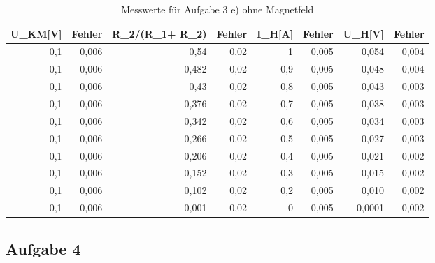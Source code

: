 \documentclass[12pt]{scrartcl}
\begin{document}
\begin{table}[htbp]
\caption{Messwerte für Aufgabe 3 e) ohne Magnetfeld}
\begin{center}
\begin{tabular}{|r|r|r|r|r|r|r|r|}
\hline
\multicolumn{1}{|l|}{U\_KM[V]} & \multicolumn{1}{l|}{Fehler} & \multicolumn{1}{l|}{R\_2/(R\_1+ R\_2)} & \multicolumn{1}{l|}{Fehler} & \multicolumn{1}{l|}{I\_H[A]} & \multicolumn{1}{l|}{Fehler} & \multicolumn{1}{l|}{U\_H[V]} & \multicolumn{1}{l|}{Fehler} \\ \hline
0,1 & 0,006 & 0,54 & 0,02 & 1 & 0,005 & 0,054 & 0,004 \\ \hline
0,1 & 0,006 & 0,482 & 0,02 & 0,9 & 0,005 & 0,048 & 0,004 \\ \hline
0,1 & 0,006 & 0,43 & 0,02 & 0,8 & 0,005 & 0,043 & 0,003 \\ \hline
0,1 & 0,006 & 0,376 & 0,02 & 0,7 & 0,005 & 0,038 & 0,003 \\ \hline
0,1 & 0,006 & 0,342 & 0,02 & 0,6 & 0,005 & 0,034 & 0,003 \\ \hline
0,1 & 0,006 & 0,266 & 0,02 & 0,5 & 0,005 & 0,027 & 0,003 \\ \hline
0,1 & 0,006 & 0,206 & 0,02 & 0,4 & 0,005 & 0,021 & 0,002 \\ \hline
0,1 & 0,006 & 0,152 & 0,02 & 0,3 & 0,005 & 0,015 & 0,002 \\ \hline
0,1 & 0,006 & 0,102 & 0,02 & 0,2 & 0,005 & 0,010 & 0,002 \\ \hline
0,1 & 0,006 & 0,001 & 0,02 & 0 & 0,005 & 0,0001 & 0,002 \\ \hline
\end{tabular}
\end{center}
\label{aufgabe_3_e_o}
\end{table}

\newpage

\subsection{Aufgabe 4}
\end{document}
